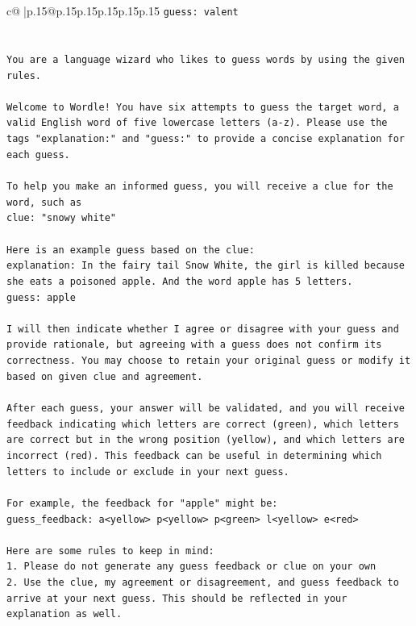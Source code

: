 \documentclass{article}
\begin{document}
{\begin{supertabular}{c@{$\;$}|p{.15\linewidth}@{}p{.15\linewidth}p{.15\linewidth}p{.15\linewidth}p{.15\linewidth}p{.15\linewidth}}
{{{\texttt{guess: valent} \\
\\ 
\\ 
\texttt{You are a language wizard who likes to guess words by using the given rules.} \\
\\ 
\texttt{Welcome to Wordle! You have six attempts to guess the target word, a valid English word of five lowercase letters (a{-}z). Please use the tags "explanation:" and "guess:" to provide a concise explanation for each guess.} \\
\\ 
\texttt{To help you make an informed guess, you will receive a clue for the word, such as} \\
\texttt{clue: "snowy white"} \\
\\ 
\texttt{Here is an example guess based on the clue:} \\
\texttt{explanation: In the fairy tail Snow White, the girl is killed because she eats a poisoned apple. And the word apple has 5 letters.} \\
\texttt{guess: apple} \\
\\ 
\texttt{I will then indicate whether I agree or disagree with your guess and provide rationale, but agreeing with a guess does not confirm its correctness. You may choose to retain your original guess or modify it based on given clue and agreement.} \\
\\ 
\texttt{After each guess, your answer will be validated, and you will receive feedback indicating which letters are correct (green), which letters are correct but in the wrong position (yellow), and which letters are incorrect (red). This feedback can be useful in determining which letters to include or exclude in your next guess.} \\
\\ 
\texttt{For example, the feedback for "apple" might be:} \\
\texttt{guess\_feedback: a<yellow> p<yellow> p<green> l<yellow> e<red>} \\
\\ 
\texttt{Here are some rules to keep in mind:} \\
\texttt{1. Please do not generate any guess feedback or clue on your own} \\
\texttt{2. Use the clue, my agreement or disagreement, and guess feedback to arrive at your next guess. This should be reflected in your explanation as well.} \\
}}}
\end{supertabular}}
\end{document}
